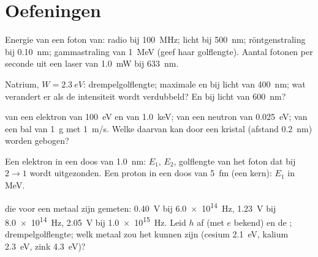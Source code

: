 \section{Oefeningen}

\begin{exercise}[$\star$]\label{exo:b1:quantum-introduction:1}
Energie van een foton van: radio bij \qty{100}{MHz}; licht bij \qty{500}{nm};
röntgenstraling bij \qty{0.10}{nm}; gammastraling van \qty{1}{MeV} (geef haar
golflengte). Aantal fotonen per seconde uit een laser van \qty{1.0}{mW} bij
\qty{633}{nm}.
\end{exercise}

\begin{exercise}[$\star$]\label{exo:b1:quantum-introduction:2}
Natrium, $W = \qty{2.3}{eV}$: drempelgolflengte; maximale 
en  bij licht van \qty{400}{nm}; wat verandert er als de
intensiteit wordt verdubbeld? En bij licht van \qty{600}{nm}?
\end{exercise}

\begin{exercise}[$\star$]\label{exo:b1:quantum-introduction:3}
 van een elektron van \qty{100}{eV} en van \qty{1.0}{keV};
van een neutron van \qty{0.025}{eV}; van een bal van \qty{1}{g} met \qty{1}{m/s}.
Welke daarvan kan door een kristal (afstand \qty{0.2}{nm}) worden gebogen?
\end{exercise}

\begin{exercise}[$\star$]\label{exo:b1:quantum-introduction:4}
Een elektron in een doos van \qty{1.0}{nm}: $E_1$, $E_2$, golflengte van het
foton dat bij $2 \to 1$ wordt uitgezonden. Een proton in een doos van \qty{5}{fm}
(een kern): $E_1$ in \unit{MeV}.
\end{exercise}

\begin{exercise}[$\star\star$]\label{exo:b1:quantum-introduction:5}
 die voor een metaal zijn gemeten: \qty{0.40}{V} bij
\qty{6.0e14}{Hz}, \qty{1.23}{V} bij \qty{8.0e14}{Hz}, \qty{2.05}{V} bij
\qty{1.0e15}{Hz}. Leid $h$ af (met $e$ bekend) en de ;
drempelgolflengte; welk metaal zou het kunnen zijn (cesium \qty{2.1}{eV},
kalium \qty{2.3}{eV}, zink \qty{4.3}{eV})?
\end{exercise}

